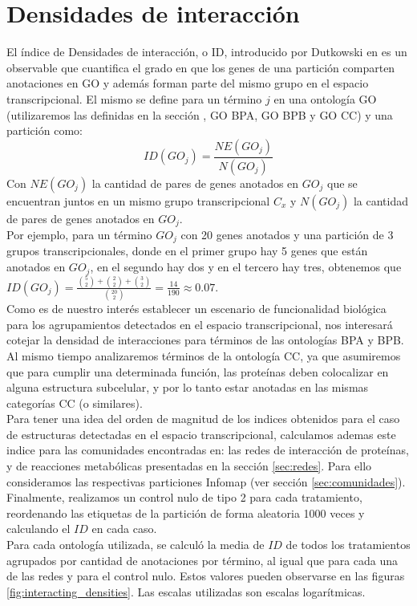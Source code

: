\section{Densidades de interacción}
El índice de Densidades de interacción, o ID, introducido por Dutkowski en \cite{Dutkowski2013} es un observable que cuantifica el grado en que los genes de una partición comparten anotaciones en GO y además forman parte del mismo grupo en el espacio transcripcional. El mismo se define para un término $j$ en una ontología GO (utilizaremos las definidas en la sección \label{sec:go}, GO BPA, GO BPB y GO CC) y una partición como:
\begin{equation}
	ID(GO_j) = \frac{NE(GO_j)}{N(GO_j)}
\end{equation}
Con $NE(GO_j)$ la cantidad de pares de genes anotados en $GO_j$ que se encuentran juntos en un mismo grupo transcripcional $C_x$ y $N(GO_j)$ la cantidad de pares de genes anotados en $GO_j$.\\
Por ejemplo, para un término $GO_j$ con 20 genes anotados y una partición de 3 grupos transcripcionales, donde en el primer grupo hay 5 genes que están anotados en $GO_j$, en el segundo hay dos y en el tercero hay tres, obtenemos que $ID(GO_j) = \frac{\binom{5}{2}+\binom{2}{2}+\binom{3}{2}}{\binom{20}{2}}=\frac{14}{190}\approx 0.07$.\\
Como es de nuestro interés establecer un escenario de funcionalidad biológica para los agrupamientos detectados en el espacio transcripcional, nos interesará cotejar la densidad de interacciones para términos de las ontologías BPA y BPB. Al mismo tiempo analizaremos términos de la ontología CC, ya que asumiremos que para cumplir una determinada función, las proteínas deben colocalizar en alguna estructura subcelular, y por lo tanto estar anotadas en las mismas categorías CC (o similares).\\
Para tener una idea del orden de magnitud de los indices obtenidos para el caso de estructuras detectadas en el espacio transcripcional, calculamos ademas este indice para las comunidades encontradas en: las redes de interacción de proteínas, y de reacciones metabólicas presentadas en la sección \ref{sec:redes}. Para ello consideramos las respectivas particiones Infomap (ver sección \ref{sec:comunidades}).\\
Finalmente, realizamos un control nulo de tipo 2 para cada tratamiento, reordenando las etiquetas de la partición de forma aleatoria 1000 veces y calculando el $ID$ en cada caso.\\
Para cada ontología utilizada, se calculó la media de $ID$ de todos los tratamientos agrupados por cantidad de anotaciones por término, al igual que para cada una de las redes y para el control nulo. Estos valores pueden observarse en las figuras \ref{fig:interacting_densities}. Las escalas utilizadas son escalas logarítmicas. 

